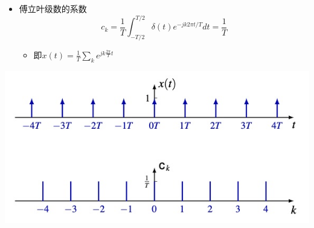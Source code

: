 \documentclass[CJKutf8,xcolor=pdftex,dvipsnames,table]{beamer}
\begin{document}
\begin{CJK*}{UTF8}{song}
\begin{frame}
\begin{itemize}
    \item 傅立叶级数的系数\[ c_k = \frac{1}{T}\int_{-T/2}^{T/2}\delta(t)e^{-jk2\pi t/T}dt = \frac{1}{T}  \]
	    \begin{itemize}
    	\item 即$x(t)=\frac{1}{T}\sum_{k}e^{jk\frac{2\pi}{T}t}$
	    \end{itemize}    
    \end{itemize}
	\begin{center}
    \includegraphics[valign=m,scale=.4]{pulsetrain}  
    \end{center}
  \end{frame}       
    

\end{CJK*}
\end{document}
